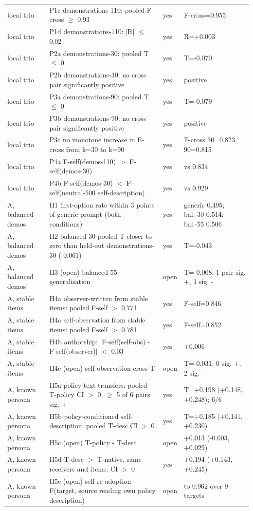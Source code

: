 {\begin{longtable}{>{\raggedright\arraybackslash}p{3.0cm}>{\raggedright\arraybackslash}p{6.6cm}>{\raggedright\arraybackslash}p{0.9cm}>{\raggedright\arraybackslash}p{4.5cm}}
local trio & P1c demonstrations-110: pooled F-cross $\geq$ 0.93 & yes & F-cross=0.955 \\
local trio & P1d demonstrations-110: $|$R$|$ $\leq$ 0.02 & yes & R=+0.003 \\
local trio & P2a demonstrations-30: pooled T $\leq$ 0 & yes & T=-0.070 \\
local trio & P2b demonstrations-30: no cross pair significantly positive & yes & 0 positive \\
local trio & P3a demonstrations-90: pooled T $\leq$ 0 & yes & T=-0.079 \\
local trio & P3b demonstrations-90: no cross pair significantly positive & yes & 0 positive \\
local trio & P3c no monotone increase in F-cross from k=30 to k=90 & yes & F-cross 30=0.823, 90=0.815 \\
local trio & P4a F-self(demos-110) $>$ F-self(demos-30) & yes & 0.958 vs 0.834 \\
local trio & P4b F-self(demos-30) $<$ F-self(neutral-500 self-description) & yes & 0.834 vs 0.929 \\
A, balanced demos & H1 first-option rate within 3 points of generic prompt (both conditions) & yes & generic 0.495; bal.-30 0.514; bal.-55 0.506 \\
A, balanced demos & H2 balanced-30 pooled T closer to zero than held-out demonstrations-30 (-0.061) & yes & T=-0.043 \\
A, balanced demos & H3 (open) balanced-55 generalisation & open & T=-0.008; 1 pair sig. +, 1 sig. - \\
A, stable items & H4a observer-written from stable items: pooled F-self $>$ 0.771 & yes & F-self=0.846 \\
A, stable items & H4a self-observation from stable items: pooled F-self $>$ 0.781 & yes & F-self=0.852 \\
A, stable items & H4b authorship: $|$F-self(self-obs) - F-self(observer)$|$ $<$ 0.03 & yes & +0.006 \\
A, stable items & H4c (open) self-observation cross T & open & T=-0.031; 0 sig. +, 2 sig. - \\
A, known persona & H5a policy text transfers: pooled T-policy CI $>$ 0, $\geq$ 5 of 6 pairs sig. + & yes & T=+0.198 (+0.148, +0.248); 6/6 \\
A, known persona & H5b policy-conditioned self-description: pooled T-desc CI $>$ 0 & yes & T=+0.185 (+0.141, +0.230) \\
A, known persona & H5c (open) T-policy - T-desc & open & +0.013 (-0.003, +0.029) \\
A, known persona & H5d T-desc $>$ T-native, same receivers and items: CI $>$ 0 & yes & +0.194 (+0.143, +0.245) \\
A, known persona & H5e (open) self re-adoption F(target, source reading own policy description) & open & 0.899 to 0.962 over 9 targets \\
\end{longtable}}
